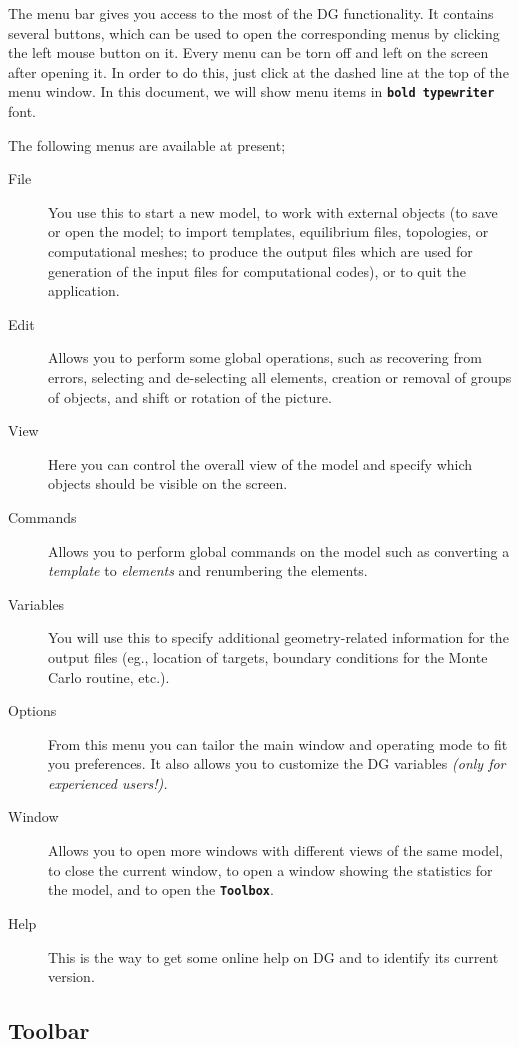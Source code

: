 \documentclass[12pt]{report}
\begin{document}
The menu bar gives you access to the most of the DG functionality. It
contains several buttons, which can be used to open the corresponding
menus by clicking the left mouse button on it. Every menu can be torn
off and left on the screen after opening it. In order to do this, just
click at the dashed line at the top of the menu window.  In this document,
we will show menu items in \textbf{\texttt{bold typewriter}} font.

The following
menus are available at present;

\begin{description}
  \item[File] You use this to start a new model, to work with
external objects (to save or open the model; to import templates,
equilibrium files, topologies, 
or computational meshes; to produce the output files
which are used for generation of the input files for computational
codes), or to quit the application.
  \item[Edit] Allows you to perform some global operations,
such as recovering from errors, selecting and de-selecting all
elements, creation or removal of groups of objects, and shift or
rotation of the picture.
  \item[View] Here you can control the overall view of the
model and specify which objects should be
visible on the screen.
  \item[Commands] Allows you to perform global commands on
the model such as converting 
a \textit{template} to \textit{elements} and 
renumbering the elements.
  \item[Variables] You will use this to specify
additional geometry-related information for the output files (eg.,
location of targets, boundary conditions for the Monte Carlo routine,
etc.).
  \item[Options] From this menu you can tailor the main window
and operating mode
to fit you preferences. It also allows you to customize the DG
variables \textit{(only for experienced users!).}
  \item[Window] Allows you to open more windows with
different views of the same model, to close the current window, to open
a window showing the statistics for the model, and to open the
\textbf{\texttt{Toolbox}}.
  \item[Help] This is the way to get some online help on DG and
to identify its current version.
\end{description}

\subsection{Toolbar}
\end{document}
